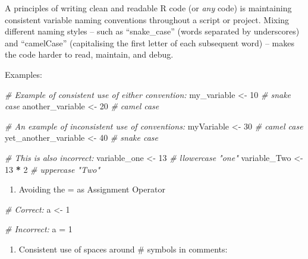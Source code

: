 \documentclass[
  10t,
]{article}
\newenvironment{Shaded}{\begin{snugshade}}{\end{snugshade}}
\newcommand{\CommentTok}[1]{\textcolor[rgb]{0.56,0.35,0.01}{\textit{#1}}}
\newcommand{\DecValTok}[1]{\textcolor[rgb]{0.00,0.00,0.81}{#1}}
\newcommand{\NormalTok}[1]{#1}
\newcommand{\OtherTok}[1]{\textcolor[rgb]{0.56,0.35,0.01}{#1}}
\newcommand{\SpecialCharTok}[1]{\textcolor[rgb]{0.81,0.36,0.00}{\textbf{#1}}}
\providecommand{\tightlist}{%
  \setlength{\itemsep}{0pt}\setlength{\parskip}{0pt}}
\begin{document}
A principles of writing clean and readable R code (or \emph{any} code)
is maintaining consistent variable naming conventions throughout a
script or project. Mixing different naming styles -- such as
``snake\_case'' (words separated by underscores) and ``camelCase''
(capitalising the first letter of each subsequent word) -- makes the
code harder to read, maintain, and debug.

Examples:

\begin{Shaded}
\begin{Highlighting}[]
\CommentTok{\# Example of consistent use of either convention:}
\NormalTok{my\_variable }\OtherTok{\textless{}{-}} \DecValTok{10} \CommentTok{\# snake case}
\NormalTok{another\_variable }\OtherTok{\textless{}{-}} \DecValTok{20} \CommentTok{\# camel case}

\CommentTok{\# An example of inconsistent use of conventions:}
\NormalTok{myVariable }\OtherTok{\textless{}{-}} \DecValTok{30} \CommentTok{\# camel case}
\NormalTok{yet\_another\_variable }\OtherTok{\textless{}{-}} \DecValTok{40} \CommentTok{\# snake case}

\CommentTok{\# This is also incorrect:}
\NormalTok{variable\_one }\OtherTok{\textless{}{-}} \DecValTok{13} \CommentTok{\# llowercase "one"}
\NormalTok{variable\_Two }\OtherTok{\textless{}{-}} \DecValTok{13} \SpecialCharTok{*} \DecValTok{2} \CommentTok{\# uppercase "Two"}
\end{Highlighting}
\end{Shaded}

\begin{enumerate}
\def\labelenumi{\arabic{enumi}.}
\setcounter{enumi}{5}
\tightlist
\item
  Avoiding the = as Assignment Operator
\end{enumerate}

\begin{Shaded}
\begin{Highlighting}[]
\CommentTok{\# Correct:}
\NormalTok{a }\OtherTok{\textless{}{-}} \DecValTok{1}

\CommentTok{\# Incorrect:}
\NormalTok{a }\OtherTok{=} \DecValTok{1}
\end{Highlighting}
\end{Shaded}

\begin{enumerate}
\def\labelenumi{\arabic{enumi}.}
\setcounter{enumi}{6}
\tightlist
\item
  Consistent use of spaces around \# symbols in comments:
\end{enumerate}
\end{document}
